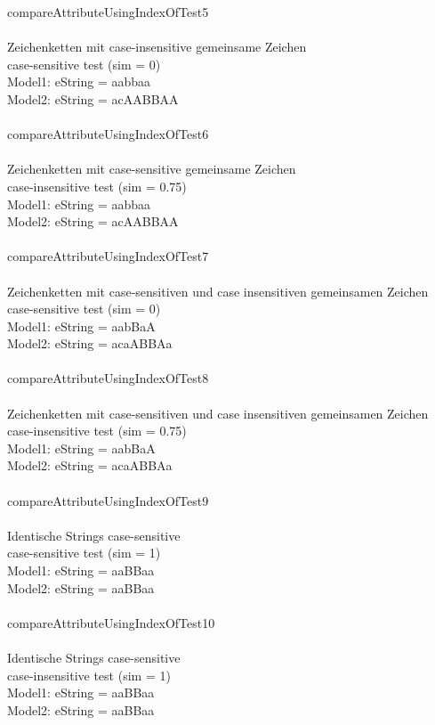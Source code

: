 compareAttributeUsingIndexOfTest5\\\\
Zeichenketten mit case-insensitive gemeinsame Zeichen\\
case-sensitive test (sim = 0)\\
Model1: eString = aabbaa\\
Model2: eString = acAABBAA\\\\

compareAttributeUsingIndexOfTest6\\\\
Zeichenketten mit case-sensitive gemeinsame Zeichen\\
case-insensitive test (sim = 0.75)\\
Model1: eString = aabbaa\\
Model2: eString = acAABBAA\\\\

compareAttributeUsingIndexOfTest7\\\\
Zeichenketten mit case-sensitiven und case insensitiven gemeinsamen Zeichen\\
case-sensitive test (sim = 0)\\
Model1: eString = aabBaA\\
Model2: eString = acaABBAa\\\\

compareAttributeUsingIndexOfTest8\\\\
Zeichenketten mit case-sensitiven und case insensitiven gemeinsamen Zeichen\\
case-insensitive test (sim = 0.75)\\
Model1: eString = aabBaA\\
Model2: eString = acaABBAa\\\\

compareAttributeUsingIndexOfTest9\\\\
Identische Strings case-sensitive\\
case-sensitive test (sim = 1)\\
Model1: eString = aaBBaa\\
Model2: eString = aaBBaa\\\\

compareAttributeUsingIndexOfTest10\\\\
Identische Strings case-sensitive\\
case-insensitive test (sim = 1)\\
Model1: eString = aaBBaa\\
Model2: eString = aaBBaa\\\\

